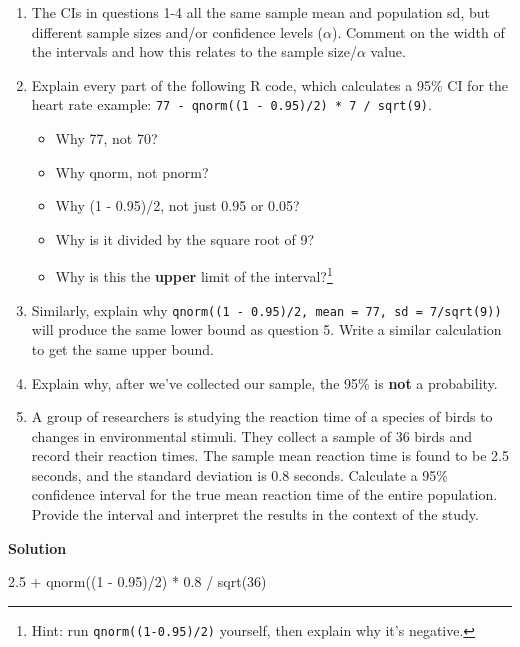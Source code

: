\documentclass[
  letterpaper,
  DIV=11,
  numbers=noendperiod,
  oneside]{scrreprt}
\newenvironment{Shaded}{\begin{snugshade}}{\end{snugshade}}
\newcommand{\DecValTok}[1]{\textcolor[rgb]{0.68,0.00,0.00}{#1}}
\newcommand{\FloatTok}[1]{\textcolor[rgb]{0.68,0.00,0.00}{#1}}
\newcommand{\FunctionTok}[1]{\textcolor[rgb]{0.28,0.35,0.67}{#1}}
\newcommand{\NormalTok}[1]{\textcolor[rgb]{0.00,0.23,0.31}{#1}}
\newcommand{\SpecialCharTok}[1]{\textcolor[rgb]{0.37,0.37,0.37}{#1}}
\providecommand{\tightlist}{%
  \setlength{\itemsep}{0pt}\setlength{\parskip}{0pt}}\usepackage{longtable,booktabs,array}
\begin{document}
\begin{enumerate}
\def\labelenumi{\arabic{enumi}.}
\setcounter{enumi}{4}
\tightlist
\item
  The CIs in questions 1-4 all the same sample mean and population sd,
  but different sample sizes and/or confidence levels (\(\alpha\)).
  Comment on the width of the intervals and how this relates to the
  sample size/\(\alpha\) value.
\item
  Explain every part of the following R code, which calculates a 95\% CI
  for the heart rate example:
  \texttt{77\ -\ qnorm((1\ -\ 0.95)/2)\ *\ 7\ /\ sqrt(9)}.

  \begin{itemize}
  \tightlist
  \item
    Why 77, not 70?
  \item
    Why qnorm, not pnorm?
  \item
    Why (1 - 0.95)/2, not just 0.95 or 0.05?
  \item
    Why is it divided by the square root of 9?
  \item
    Why is this the \textbf{upper} limit of the interval?\footnote{Hint:
      run \texttt{qnorm((1-0.95)/2)} yourself, then explain why it's
      negative.}
  \end{itemize}
\item
  Similarly, explain why
  \texttt{qnorm((1\ -\ 0.95)/2,\ mean\ =\ 77,\ sd\ =\ 7/sqrt(9))} will
  produce the same lower bound as question 5. Write a similar
  calculation to get the same upper bound.
\item
  Explain why, after we've collected our sample, the 95\% is
  \textbf{not} a probability.
\item
  A group of researchers is studying the reaction time of a species of
  birds to changes in environmental stimuli. They collect a sample of 36
  birds and record their reaction times. The sample mean reaction time
  is found to be 2.5 seconds, and the standard deviation is 0.8 seconds.
  Calculate a 95\% confidence interval for the true mean reaction time
  of the entire population. Provide the interval and interpret the
  results in the context of the study.
\end{enumerate}

\textbf{Solution}

\begin{Shaded}
\begin{Highlighting}[]
\FloatTok{2.5} \SpecialCharTok{+} \FunctionTok{qnorm}\NormalTok{((}\DecValTok{1} \SpecialCharTok{{-}} \FloatTok{0.95}\NormalTok{)}\SpecialCharTok{/}\DecValTok{2}\NormalTok{) }\SpecialCharTok{*} \FloatTok{0.8} \SpecialCharTok{/} \FunctionTok{sqrt}\NormalTok{(}\DecValTok{36}\NormalTok{)}
\end{Highlighting}
\end{Shaded}
\end{document}
